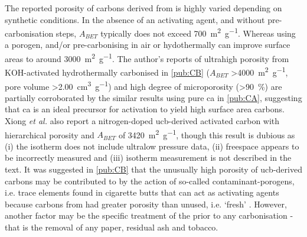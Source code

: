 \begin{sloppypar}
The reported porosity of carbons derived from  is highly varied depending on synthetic conditions. In the absence of an \gls{activating agent}, and without pre-carbonisation steps, $A_{BET}$ typically does not exceed \qty{700}{\metre\squared\per\gram}.\citep{Koochaki2019, Soltani2013, Yazdi2012, Lee2014, Hamzah2017} Whereas using a \gls{porogen}, and/or pre-carbonising in air or hydothermally can improve surface areas to around \qty{3000}{\metre\squared\per\gram}.\citep{Xiong2018a, Koochaki2019, Sun2017, Bilge2019} The author's reports of ultrahigh porosity from KOH-activated hydrothermally carbonised  in \ref{pub:CB} ($A_{BET}$ \qty{>4000}{\metre\squared\per\gram}, pore volume \qty{>2.00}{\cm\cubed\per\gram}) and high degree of microporosity (\qty{>90}{\percent}) are partially corroborated by the similar results using pure \acrfull{ca} in \ref{pub:CA}, suggesting that \acrshort{ca} is an ideal precursor for activation to yield high surface area carbons. Xiong \textit{et al.} also report a nitrogen-doped \acrshort{ucb}-derived activated carbon with hierarchical porosity and $A_{BET}$ of \qty{3420}{\metre\squared\per\gram}, though this result is dubious as (i) the  isotherm does not include ultralow pressure data, (ii) freespace appears to be incorrectly measured and (iii) isotherm measurement is not described in the text.\citep{xiong2019nitrogen} It was suggested in \ref{pub:CB} that the unusually high porosity of \acrshort{ucb}-derived carbons may be contributed to by the action of so-called contaminant-\glspl{porogen}, i.e. trace elements found in cigarette butts that can act as \glspl{activating agent} because carbons from  had greater porosity than unused, i.e. `fresh' . However, another factor may be the specific treatment of the  prior to any carbonisation - that is the removal of any paper, residual ash and tobacco.
\end{sloppypar}

